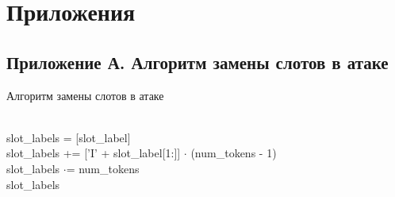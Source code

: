 \section*{Приложения}

\subsection*{Приложение А. Алгоритм замены слотов в атаке}

\begin{algorithm}
    \caption{Алгоритм замены слотов в атаке}
    \begin{algorithmic}
            \\
            \ind slot\_labels = [slot\_label]
            \ind{}
                    \ind\ind{}
                                \\
                                \ind\ind\ind slot\_labels += ['I' + slot\_label[1:]] $\cdot$ (num\_tokens - 1)
                    \Else
                                \\
                                \ind\ind\ind slot\_labels $\cdot$= num\_tokens
                    \EndIf
            \EndIf \\
            \ind\Return slot\_labels
        \EndFunction
    \end{algorithmic}\label{alg:algorithm3}
\end{algorithm}
